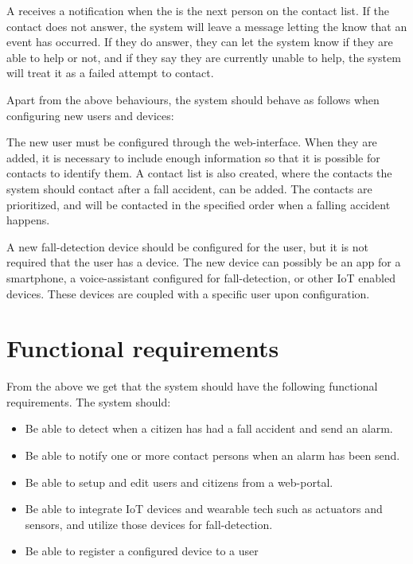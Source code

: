 A \guardian receives a notification when the \guardian is the next person on the contact list. If the contact does not answer, the system will leave a message letting the \guardian know that an event has occurred. If they do answer, they can let the system know if they are able to help or not, and if they say they are currently unable to help, the system will treat it as a failed attempt to contact.

Apart from the above behaviours, the system should behave as follows when configuring new users and devices:

The new user must be configured through the web-interface. When they are added, it is necessary to include enough information so that it is possible for contacts to identify them. A contact list is also created, where the contacts the system should contact after a fall accident, can be added. The contacts are prioritized, and will be contacted in the specified order when a falling accident happens. 

A new fall-detection device should be configured for the user, but it is not required that the user has a device.
The new device can possibly be an app for a smartphone, a voice-assistant configured for fall-detection, or other IoT enabled devices. These devices are coupled with a specific user upon configuration.



\section{Functional requirements}
From the above we get that the system should have the following functional requirements. The system should:

\begin{itemize}
    \item Be able to detect when a citizen has had a fall accident and send an alarm.
    
    \item Be able to notify one or more contact persons when an alarm has been send.
    
    \item Be able to setup and edit users and citizens from a web-portal.
    
    \item Be able to integrate IoT devices and wearable tech such as actuators and sensors, and utilize those devices for fall-detection.
    
    \item Be able to register a configured device to a user
    
\end{itemize}


